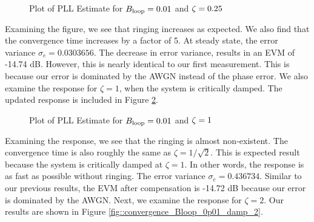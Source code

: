 \documentclass{article}
\begin{document}
\begin{figure}[H]
	\centerline{}
	\caption{Plot of PLL Estimate for $\protect{B_\text{loop}} = 0.01$ and $\protect{\zeta = 0.25}$}
	\label{fig::convergence_Bloop_0p01_damp_0p25}
\end{figure}

\noindent Examining the figure, we see that ringing increases as expected. We also find that the convergence time increases by a factor of 5. At steady state, the error variance $\sigma_e=0.0303656$. The decrease in error variance, results in an EVM of -14.74 dB. However, this is nearly identical to our first measurement. This is because our error is dominated by the AWGN instead of the phase error. We also examine the response for $\zeta = 1$, when the system is critically damped. The updated response is included in Figure \ref{fig::convergence_Bloop_0p01_damp_1}.

\begin{figure}[H]
	\centerline{}
	\caption{Plot of PLL Estimate for $\protect{B_\text{loop}} = 0.01$ and $\protect{\zeta = 1}$}
	\label{fig::convergence_Bloop_0p01_damp_1}
\end{figure}

\noindent Examining the response, we see that the ringing is almost non-existent. The convergence time is also roughly the same as $\zeta = 1/\sqrt{2}$. This is expected result because the system is critically damped at $\zeta = 1$. In other words, the response is as fast as possible without ringing. The error variance $\sigma_e=0.436734$. Similar to our previous results, the EVM after compensation is -14.72 dB because our error is dominated by the AWGN. Next, we examine the response for $\zeta = 2$. Our results are shown in Figure \ref{fig::convergence_Bloop_0p01_damp_2}.
\end{document}
